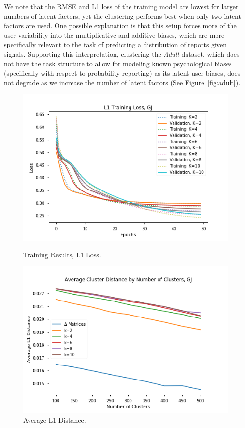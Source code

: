 \documentclass{article}
\begin{document}
We note that the RMSE and L1 loss of the training model are lowest for larger numbers of latent factors, yet the clustering performs best when only two latent factors are used. One possible explanation is that this setup forces more of the user variability into the multiplicative and additive biases, which are more specifically relevant to the task of predicting a distribution of reports given signals. Supporting this interpretation, clustering the \emph{Adult} dataset, which does not have the task structure to allow for modeling known psychological biases (specifically with respect to probability reporting) as its latent user biases, does not degrade as we increase the number of latent factors (See Figure~\ref{fig:adult}).

\begin{figure}
  \centering
  \includegraphics[width= \columnwidth]{training.png}
  \caption{\label{fig:train} Training Results, L1 Loss.}
  \includegraphics[width= \columnwidth]{clust_dist.png}
  \caption{\label{fig:clust_dist} Average L1 Distance.}
\end{figure}
\end{document}

